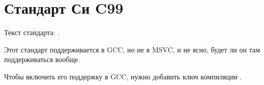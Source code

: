 ﻿\label{C99}
\chapter{Стандарт Си C99}

Текст стандарта: \cite{C99TC3}.

Этот стандарт поддерживается в GCC, но не в MSVC, и не ясно, будет ли он там поддерживаться вообще.

Чтобы включить его поддержку в GCC, нужно добавить ключ компиляции .
